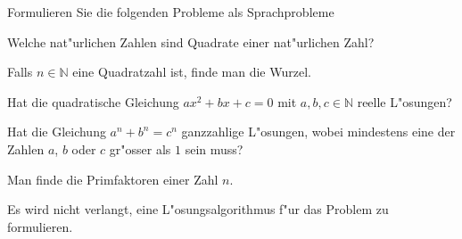 Formulieren Sie die folgenden Probleme als Sprachprobleme
\begin{teilaufgaben}
\item Welche nat"urlichen Zahlen sind Quadrate einer nat"urlichen Zahl?
\item Falls $n\in\mathbb N$ eine Quadratzahl ist, finde man die Wurzel.
\item Hat die quadratische Gleichung $ax^2+bx+c=0$ mit $a,b,c\in\mathbb N$
reelle L"osungen?
\item Hat die Gleichung $a^n+b^n=c^n$ ganzzahlige L"osungen, wobei mindestens
eine der Zahlen $a$, $b$ oder $c$ gr"osser als $1$ sein muss?
\item Man finde die Primfaktoren einer Zahl $n$.
\end{teilaufgaben}

\begin{hinweis}
Es wird nicht verlangt, eine L"osungsalgorithmus f"ur das Problem zu
formulieren.
\end{hinweis}

